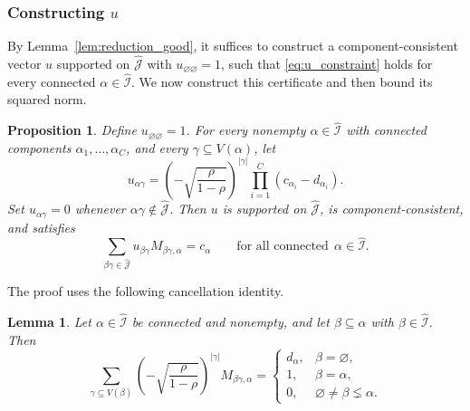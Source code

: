 \documentclass[11pt, letterpaper]{article}
\newtheorem{lemma}[theorem]{Lemma}
\newtheorem{proposition}[theorem]{Proposition}
\numberwithin{equation}{section}
\newcommand{\goodI}{\widehat{\mathcal{I}}}
\newcommand{\goodJ}{\widehat{\mathcal{J}}}
\begin{document}
\subsubsection*{Constructing $u$} 
By Lemma~\ref{lem:reduction_good}, it suffices to construct a
component-consistent vector $u$ supported on $\goodJ$ with
$u_{\varnothing\varnothing}=1$, such that \eqref{eq:u_constraint} holds for every
connected $\alpha\in\goodI$. We now construct this certificate and then
bound its squared norm.
\begin{proposition}\label{prop:u-PSM}
Define  $u_{\varnothing\varnothing}=1$. For every nonempty $\alpha\in\goodI$ with connected components
$\alpha_1,\ldots,\alpha_C$, and every $\gamma\subseteq V(\alpha)$, let
\[
u_{\alpha\gamma}
=
\left(-\sqrt{\frac{\rho}{1-\rho}}\right)^{|\gamma|}
\prod_{i=1}^C (c_{\alpha_i}-d_{\alpha_i}).
\]
Set $u_{\alpha\gamma}=0$ whenever $\alpha \gamma\notin\goodJ$. Then $u$ is supported on $\goodJ$, is component-consistent, and satisfies
\[
\sum_{\beta\gamma\in\goodJ}
u_{\beta\gamma}M_{\beta\gamma,\alpha}
=
c_\alpha \qquad \text{for all connected} \ \ \alpha \in \goodI.
\]
\end{proposition}
The proof uses the following cancellation identity.
\begin{lemma}\label{lem:psm-cancellation}Let $\alpha \in \goodI$ be connected and nonempty, and let $\beta \subseteq \alpha$ with $\beta \in \goodI$. Then
\[\sum_{\gamma \subseteq V(\beta)}\left(-\sqrt{\frac{\rho}{1-\rho}}\right)^{|\gamma|} M_{\beta\gamma,\alpha}=\begin{cases}
d_\alpha, & \beta=\varnothing,\\
1, & \beta=\alpha,\\
0, & \varnothing\neq\beta\lneq\alpha.
\end{cases}\]
\end{lemma}
\end{document}
